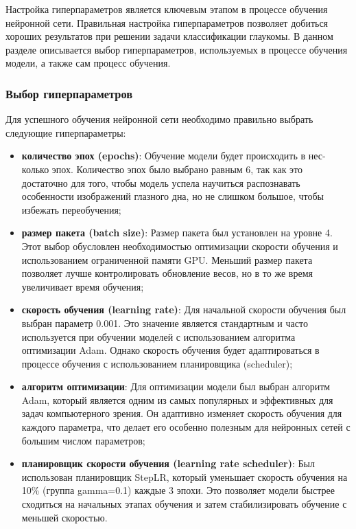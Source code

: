{    Настройка гиперпараметров является ключевым этапом в процессе обучения нейронной сети. Правильная настройка гиперпараметров позволяет добиться хороших результатов при решении задачи классификации глаукомы. В данном разделе описывается выбор гиперпараметров, используемых в процессе обучения модели, а также сам процесс обучения.

    \subsubsection*{Выбор гиперпараметров}

    Для успешного обучения нейронной сети необходимо правильно выбрать следующие гиперпараметры:

    \begin{itemize}
        \item \textbf{количество эпох (epochs)}: Обучение модели будет происходить в нес-  колько эпох. Количество эпох было выбрано равным 6, так как это достаточно для того, чтобы модель успела научиться распознавать особенности изображений глазного дна, но не слишком большое, чтобы избежать переобучения;
        \item \textbf{размер пакета (batch size)}: Размер пакета был установлен на уровне 4. Этот выбор обусловлен необходимостью оптимизации скорости обучения и использованием ограниченной памяти GPU. Меньший размер пакета позволяет лучше контролировать обновление весов, но в то же время увеличивает время обучения;
        \item \textbf{скорость обучения (learning rate)}: Для начальной скорости обучения был выбран параметр 0.001. Это значение является стандартным и часто используется при обучении моделей с использованием алгоритма оптимизации Adam. Однако скорость обучения будет адаптироваться в процессе обучения с использованием планировщика (scheduler);
        \item \textbf{алгоритм оптимизации}: Для оптимизации модели был выбран алгоритм Adam, который является одним из самых популярных и эффективных для задач компьютерного зрения. Он адаптивно изменяет скорость обучения для каждого параметра, что делает его особенно полезным для нейронных сетей с большим числом параметров;
        \item \textbf{планировщик скорости обучения (learning rate scheduler)}: Был использован планировщик StepLR, который уменьшает скорость обучения на 10\% (группа gamma=0.1) каждые 3 эпохи. Это позволяет модели быстрее сходиться на начальных этапах обучения и затем стабилизировать обучение с меньшей скоростью.
    \end{itemize}

}
